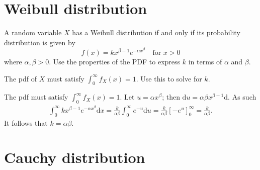 \section{Weibull distribution}
\label{sec:section-5.2}

	\begin{exercise}
		A random variable $X$ has a Weibull distribution if and only if its probability distribution is given by
		\begin{equation}
			f(x) = kx^{\beta - 1} e^{- \alpha x^{\beta}} \quad \text{for } x > 0
		\end{equation}
		where $\alpha, \beta > 0$. Use the properties of the PDF to express $k$ in terms of $\alpha$ and $\beta$.
		\begin{hint}
			The pdf of $X$ must satisfy $\int_0^{\infty} f_X(x) = 1$. Use this to solve for $k$.
		\end{hint}
		\begin{solution}
			The pdf must satisfy $\int_0^{\infty} f_X(x) = 1$. Let $u = \alpha x^{\beta}$; then $\mathrm{d} u = \alpha \beta x^{\beta - 1} \mathrm{d}$. As such
			\begin{align*}
				\int_0^{\infty} k x^{\beta - 1} e^{- \alpha x^{\beta}} \mathrm{d}x = \frac{k}{\alpha \beta} \int_0^{\infty} e^{-u} \mathrm{d}u = \frac{k}{\alpha \beta} \left[-e^u\right]_0^{\infty} = \frac{k}{\alpha \beta}.
			\end{align*}
			It follows that $k = \alpha \beta$.
		\end{solution}
	\end{exercise}

\section{Cauchy distribution}
\label{sec:section-5.3}
	
